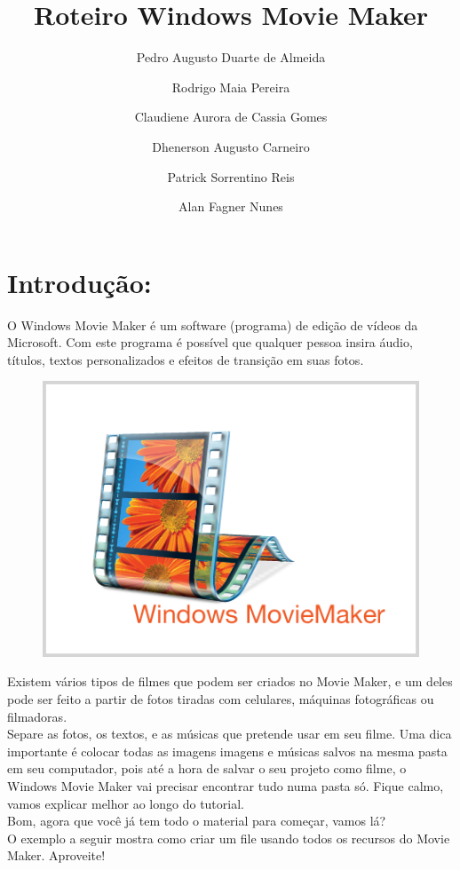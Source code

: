 \documentclass{article}
\title{Roteiro Windows Movie Maker}
\author{
    Pedro Augusto Duarte de Almeida\\
    \and
    Rodrigo Maia Pereira\\
    \and
    Claudiene Aurora de Cassia Gomes\\
    \and
    Dhenerson Augusto Carneiro\\
    \and
    Patrick Sorrentino Reis\\
    \and
    Alan Fagner Nunes\\
}
\date{}
\begin{document}
\maketitle

\section{Introdução:}
O Windows Movie Maker é um software (programa) de edição de vídeos da Microsoft.
Com este programa é possível que qualquer pessoa insira áudio, títulos, textos personalizados e efeitos de transição em suas fotos.

\begin{figure}[h!]
\centering
\includegraphics[scale=0.35]{movie-maker.png}
\end{figure} 

Existem vários tipos de filmes que podem ser criados no Movie Maker, e um deles pode ser feito a partir de fotos tiradas com celulares, máquinas fotográficas ou filmadoras.\\

Separe as fotos, os textos, e as músicas que pretende usar em seu filme. Uma dica importante é colocar todas as imagens imagens e músicas salvos na mesma pasta em seu computador, pois até a hora de salvar o seu projeto como filme, o Windows Movie Maker vai precisar encontrar tudo numa pasta só. Fique calmo, vamos explicar melhor ao longo do tutorial.\\

Bom, agora que você já tem todo o material para começar, vamos lá?\\

O exemplo a seguir mostra como criar um file usando todos os recursos do
Movie Maker. Aproveite!
\end{document}

